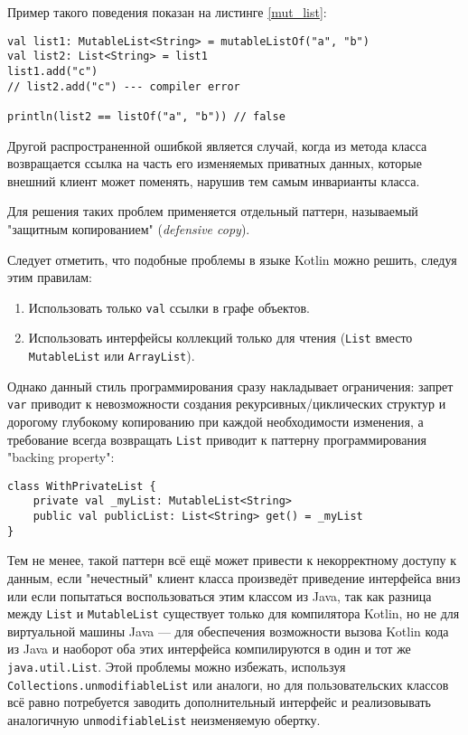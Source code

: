 \documentclass[specification,annotation,times]{itmo-student-thesis}
\begin{document}
Пример такого поведения показан на листинге \ref{mut_list}:

\begin{lstlisting}[float=h!,caption={Один список с разными типами ссылок},label={mut_list}]
val list1: MutableList<String> = mutableListOf("a", "b")
val list2: List<String> = list1
list1.add("c")
// list2.add("c") --- compiler error

println(list2 == listOf("a", "b")) // false
\end{lstlisting}

Другой распространенной ошибкой является случай, когда из метода класса возвращается ссылка на часть его изменяемых приватных данных, которые внешний клиент может поменять, нарушив тем самым инварианты класса.

Для решения таких проблем применяется отдельный паттерн, называемый "защитным копированием" (\textit{defensive copy}).

Следует отметить, что подобные проблемы в языке Kotlin можно решить, следуя этим правилам:

\begin{enumerate}
	\item Использовать только \texttt{val} ссылки в графе объектов.
	\item Использовать интерфейсы коллекций только для чтения (\texttt{List} вместо \texttt{MutableList} или \texttt{ArrayList}).
\end{enumerate}

Однако данный стиль программирования сразу накладывает ограничения: запрет \texttt{var} приводит к невозможности создания рекурсивных/циклических структур и дорогому глубокому копированию при каждой необходимости изменения, а требование всегда возвращать \texttt{List} приводит к паттерну программирования "backing property":

\begin{lstlisting}[float=h!,caption={Backing property},label={backing_property}]
class WithPrivateList {
	private val _myList: MutableList<String>
	public val publicList: List<String> get() = _myList
}
\end{lstlisting}

Тем не менее, такой паттерн всё ещё может привести к некорректному доступу к данным, если "нечестный" клиент класса произведёт приведение интерфейса вниз или если попытаться воспользоваться этим классом из Java,
так как разница между \texttt{List} и \texttt{MutableList} существует только для компилятора Kotlin, но не для виртуальной машины Java --- для обеспечения возможности вызова Kotlin кода из Java и наоборот оба этих интерфейса компилируются в один и тот же \texttt{java.util.List}.
Этой проблемы можно избежать, используя \texttt{Collections.unmodifiableList} или аналоги, но для пользовательских классов всё равно потребуется заводить дополнительный интерфейс и реализовывать аналогичную \texttt{unmodifiableList} неизменяемую обертку.
\end{document}
